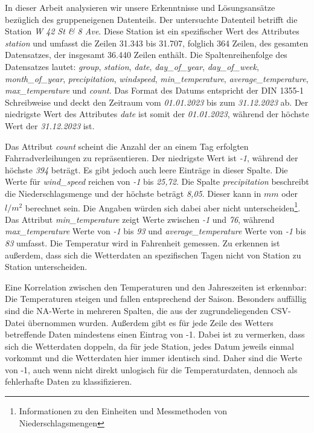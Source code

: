 \documentclass{article}
\begin{document}
In dieser Arbeit analysieren wir unsere Erkenntnisse und Lösungsansätze bezüglich des gruppeneigenen Datenteils. Der untersuchte Datenteil betrifft die Station \textit{W 42 St \& 8 Ave}. Diese Station ist ein spezifischer Wert des Attributes \textit{station} und umfasst die Zeilen 31.343 bis 31.707, folglich 364 Zeilen, des gesamten Datensatzes, der insgesamt 36.440 Zeilen enthält. Die Spaltenreihenfolge des Datensatzes lautet: 
\textit{group}, \textit{station}, \textit{date}, \textit{day\_of\_year}, \textit{day\_of\_week}, \textit{month\_of\_year}, \textit{precipitation}, \textit{windspeed},  \textit{min\_temperature}, \textit{average\_temperature}, \textit{max\_temperature} und \textit{count}. Das Format des Datums entspricht der DIN 1355-1 Schreibweise und deckt den Zeitraum vom \textit{01.01.2023} bis zum \textit{31.12.2023} ab. Der niedrigste Wert des Attributes \textit{date} ist somit der \textit{01.01.2023}, während der höchste Wert der \textit{31.12.2023} ist. 

Das Attribut \textit{count} scheint die Anzahl der an einem Tag erfolgten Fahrradverleihungen zu repräsentieren. Der niedrigste Wert ist \textit{-1}, während der höchste \textit{394} beträgt. Es gibt jedoch auch leere Einträge in dieser Spalte. Die Werte für \textit{wind\_speed} reichen von \textit{-1} bis \textit{25,72}. Die Spalte \textit{precipitation} beschreibt die Niederschlagsmenge und der höchste beträgt \textit{8,05}. Dieser kann in $mm$ oder $l/m^2$ berechnet sein. Die Angaben würden sich dabei aber nicht unterscheiden\footnote{Informationen zu den Einheiten und Messmethoden von Niederschlagsmengen\cite{tfa_niederschlag}}. Das Attribut \textit{min\_temperature} zeigt Werte zwischen \textit{-1} und \textit{76}, während \textit{max\_temperature} Werte von \textit{-1} bis \textit{93} und \textit{average\_temperature} Werte von \textit{-1} bis \textit{83} umfasst. Die Temperatur wird in Fahrenheit gemessen. Zu erkennen ist außerdem, dass sich die Wetterdaten an spezifischen Tagen nicht von Station zu Station unterscheiden.

Eine Korrelation zwischen den Temperaturen und den Jahreszeiten ist erkennbar: Die Temperaturen steigen und fallen entsprechend der Saison. Besonders auffällig sind die NA-Werte in mehreren Spalten, die aus der zugrundeliegenden CSV-Datei übernommen wurden.
Außerdem gibt es für jede Zeile des Wetters betreffende Daten mindestens einen Eintrag von -1. Dabei ist zu vermerken, dass sich die Wetterdaten doppeln, da für jede Station, jedes Datum jeweils einmal vorkommt und die Wetterdaten hier immer identisch sind. Daher sind die Werte von -1, auch wenn nicht direkt unlogisch für die Temperaturdaten, dennoch als fehlerhafte Daten zu klassifizieren.
\end{document}
